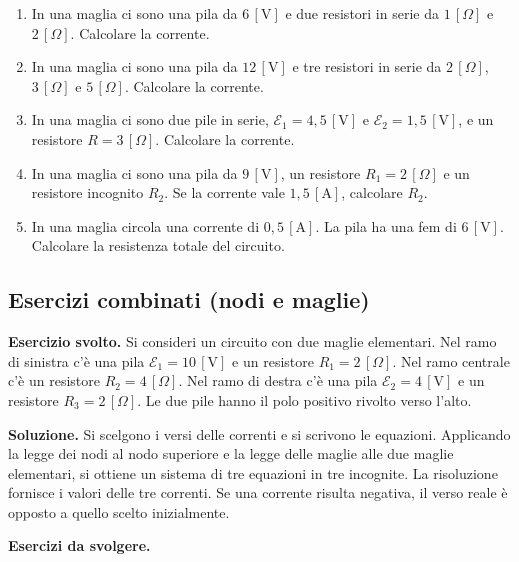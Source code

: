 \begin{enumerate}[leftmargin=1cm]
  \item In una maglia ci sono una pila da \(6\,[\text{V}]\) e due resistori in serie da \(1\,[\Omega]\) e \(2\,[\Omega]\). Calcolare la corrente.
  \item In una maglia ci sono una pila da \(12\,[\text{V}]\) e tre resistori in serie da \(2\,[\Omega]\), \(3\,[\Omega]\) e \(5\,[\Omega]\). Calcolare la corrente.
  \item In una maglia ci sono due pile in serie, \(\mathcal{E}_1 = 4{,}5\,[\text{V}]\) e \(\mathcal{E}_2 = 1{,}5\,[\text{V}]\), e un resistore \(R = 3\,[\Omega]\). Calcolare la corrente.
  \item In una maglia ci sono una pila da \(9\,[\text{V}]\), un resistore \(R_1 = 2\,[\Omega]\) e un resistore incognito \(R_2\). Se la corrente vale \(1{,}5\,[\text{A}]\), calcolare \(R_2\).
  \item In una maglia circola una corrente di \(0{,}5\,[\text{A}]\). La pila ha una fem di \(6\,[\text{V}]\). Calcolare la resistenza totale del circuito.
\end{enumerate}

\subsection{Esercizi combinati (nodi e maglie)}

\begin{esercizio}
\textbf{Esercizio svolto.} Si consideri un circuito con due maglie elementari. Nel ramo di sinistra c'è una pila \(\mathcal{E}_1 = 10\,[\text{V}]\) e un resistore \(R_1 = 2\,[\Omega]\). Nel ramo centrale c'è un resistore \(R_2 = 4\,[\Omega]\). Nel ramo di destra c'è una pila \(\mathcal{E}_2 = 4\,[\text{V}]\) e un resistore \(R_3 = 2\,[\Omega]\). Le due pile hanno il polo positivo rivolto verso l'alto.

\smallskip
\textbf{Soluzione.} Si scelgono i versi delle correnti e si scrivono le equazioni. Applicando la legge dei nodi al nodo superiore e la legge delle maglie alle due maglie elementari, si ottiene un sistema di tre equazioni in tre incognite. La risoluzione fornisce i valori delle tre correnti. Se una corrente risulta negativa, il verso reale è opposto a quello scelto inizialmente.
\end{esercizio}

\textbf{Esercizi da svolgere.}

